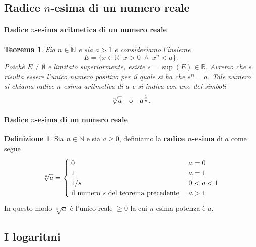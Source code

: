 \documentclass{article}
\theoremstyle{plain}
\newtheorem{thm}{Teorema}[section]
\theoremstyle{definition}
\newtheorem{defn}{Definizione}[section]
\theoremstyle{remark}
\begin{document}
\vspace{10pt}

\subsection{Radice $n$-esima di un numero reale}

\vspace{10pt}

\paragraph{Radice $n$-esima aritmetica di un numero reale}
\begin{bxthm}
\begin{thm}
    Sia $n\in\mathbb{N}$ e sia $a>1$ e consideriamo l'insieme \[E=\{x\in\mathbb{R}\,|\,x>0\;\land\;x^n<a\}.\]
    Poichè $E\neq\emptyset$ e limitato superiormente, esiste $s=\sup(E)\in\mathbb{R}$.
    Avremo che $s$ risulta essere l'unico numero positivo per il quale si ha che $s^n=a$.
    Tale numero si chiama \textit{radice $n$-esima aritmetica di $a$} e si indica con uno dei simboli \[\sqrt[n]{a}\quad\textup{o}\quad a^{\frac{1}{n}}.\]
\end{thm}
\end{bxthm}

\vspace{10pt}

\paragraph{Radice $n$-esima di un numero reale}
\begin{bxthm}
\begin{defn}
    Sia $n\in\mathbb{N}$ e sia $a\geq 0$, definiamo la \textbf{radice $n$-esima} di $a$ come segue 
    \[\sqrt[n]{a} = 
    \begin{cases}
        \;0 & a=0\\
        \;1 & a=1\\
        \;1/s & 0<a<1\\
        \;\textup{il numero } s \textup{ del teorema precedente }& a>1
    \end{cases}\]
    In questo modo $\sqrt[n]{a}$ è l'unico reale $\geq 0$ la cui $n$-esima potenza è $a$.
\end{defn}
\end{bxthm}

\vspace{10pt}

\subsection{I logaritmi}
\end{document}

